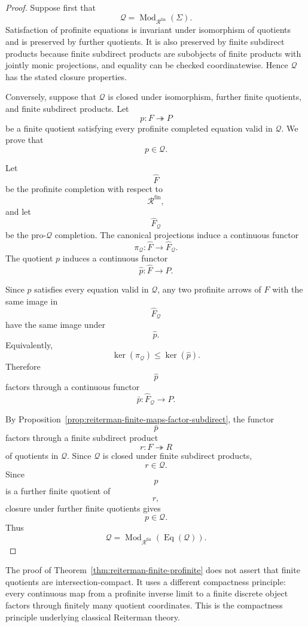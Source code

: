\begin{proof}
Suppose first that
\[
\mathcal Q=\operatorname{Mod}_{\mathcal R^{\mathrm{fin}}}(\Sigma).
\]
Satisfaction of profinite equations is invariant under isomorphism of
quotients and is preserved by further quotients. It is also preserved by
finite subdirect products because finite subdirect products are subobjects of
finite products with jointly monic projections, and equality can be checked
coordinatewise. Hence \(\mathcal Q\) has the stated closure properties.

Conversely, suppose that \(\mathcal Q\) is closed under isomorphism, further
finite quotients, and finite subdirect products. Let
\[
p:F\twoheadrightarrow P
\]
be a finite quotient satisfying every profinite completed equation valid in
\(\mathcal Q\). We prove that
\[
p\in\mathcal Q.
\]

Let
\[
\widehat F
\]
be the profinite completion with respect to
\[
\mathcal R^{\mathrm{fin}},
\]
and let
\[
\widehat F_{\mathcal Q}
\]
be the pro-\(\mathcal Q\) completion. The canonical projections induce a
continuous functor
\[
\pi_{\mathcal Q}:\widehat F\to\widehat F_{\mathcal Q}.
\]
The quotient \(p\) induces a continuous functor
\[
\widehat p:\widehat F\to P.
\]

Since \(p\) satisfies every equation valid in \(\mathcal Q\), any two
profinite arrows of \(\widehat F\) with the same image in
\[
\widehat F_{\mathcal Q}
\]
have the same image under
\[
\widehat p.
\]
Equivalently,
\[
\ker(\pi_{\mathcal Q})\leq\ker(\widehat p).
\]
Therefore
\[
\widehat p
\]
factors through a continuous functor
\[
\bar p:\widehat F_{\mathcal Q}\to P.
\]

By Proposition~\ref{prop:reiterman-finite-maps-factor-subdirect}, the functor
\[
\bar p
\]
factors through a finite subdirect product
\[
r:F\twoheadrightarrow R
\]
of quotients in \(\mathcal Q\). Since \(\mathcal Q\) is closed under finite
subdirect products,
\[
r\in\mathcal Q.
\]
Since
\[
p
\]
is a further finite quotient of
\[
r,
\]
closure under further finite quotients gives
\[
p\in\mathcal Q.
\]
Thus
\[
\mathcal Q
=
\operatorname{Mod}_{\mathcal R^{\mathrm{fin}}}(\operatorname{Eq}(\mathcal Q)).
\]
\end{proof}

\begin{remark}
\label{rem:reiterman-why-finite-separate}
The proof of Theorem~\ref{thm:reiterman-finite-profinite} does not assert
that finite quotients are intersection-compact. It uses a different
compactness principle: every continuous map from a profinite inverse limit to
a finite discrete object factors through finitely many quotient coordinates.
This is the compactness principle underlying classical Reiterman theory.
\end{remark}

